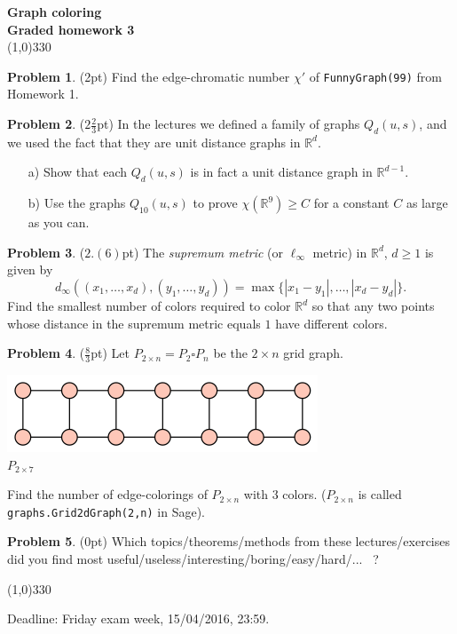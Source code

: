 \documentclass[a4paper]{article}
\theoremstyle{definition}
\newtheorem{myex}{Problem}
\begin{document}
\pagestyle{empty}
\begin{center}
	{\Large\bf Graph coloring}\\
	{\large\bf Graded homework 3}\\
	\line(1,0){330}
\end{center}

\begin{myex}(2pt)
Find the edge-chromatic number $\chi'$ of \texttt{FunnyGraph(99)} from Homework 1.
\end{myex}

\begin{myex}($2\frac{2}{3}$pt)
In the lectures we defined a family of graphs $Q_d(u,s)$, and we used the fact that they are unit distance graphs in $\mathbb{R}^d$. 

\begin{itemize}
\item[a)] Show that each $Q_d(u,s)$ is in fact a unit distance graph in $\mathbb{R}^{d-1}$. 
\item[b)] Use the graphs $Q_{10}(u,s)$ to prove $\chi(\mathbb{R}^9)\geq C$ for a constant $C$ as large as you can. 
\end{itemize}
\end{myex}

\begin{myex}($2.(6)$pt)
The \emph{supremum metric} (or $\ell_\infty$ metric) in $\mathbb{R}^d$, $d\geq 1$ is given by
$$d_\infty((x_1,\ldots,x_d),(y_1,\ldots,y_d))=\max\{|x_1-y_1|,\ldots,|x_d-y_d|\}.$$
Find the smallest number of colors required to color $\mathbb{R}^d$ so that any two points whose distance in the supremum metric equals $1$ have different colors.
\end{myex}


\begin{myex}($\frac{8}{3}$pt)
Let $P_{2\times n}=P_2\square P_n$ be the $2\times n$ grid graph. 

\begin{center}
\includegraphics[scale=0.4]{p27.png}\\
$P_{2\times 7}$
\end{center}
Find the number of edge-colorings of $P_{2\times n}$ with $3$ colors. ($P_{2\times n}$ is called \texttt{graphs.Grid2dGraph(2,n)} in Sage).
\end{myex}

\begin{myex}(0pt)
Which topics/theorems/methods from these lectures/exercises did you find most useful/useless/interesting/boring/easy/hard/... \ ?
\end{myex}

\begin{center}
	\line(1,0){330}
\end{center}
Deadline: Friday exam week, 15/04/2016, 23:59.
\end{document}

